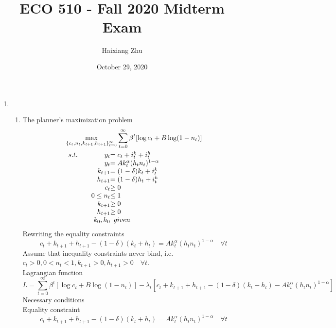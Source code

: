 \documentclass{article}
\title{ECO 510 - Fall 2020 Midterm Exam}
\date{October 29, 2020}
\author{Haixiang Zhu}
\begin{document}
    \maketitle
    \renewcommand{\arraystretch}{1.5}
    \begin{enumerate}
        \item 
        \begin{enumerate}
            \item The  planner's maximization problem
            \begin{align*}
                &\max_{\{c_t,n_t,k_{t+1},h_{t+1}\}_{t=0}^\infty}\sum_{t=0}^\infty\beta^t[\log c_t+B\log(1-n_t)]\\
                &\begin{array}{r@{\qquad}r@{}l}
                s.t.&y_t&=c_t+i_t^k+i_t^h\\
                &y_t&=Ak_t^\alpha(h_tn_t)^{1-\alpha}\\
                &k_{t+1}&=(1-\delta)k_t+i_t^k\\
                &h_{t+1}&=(1-\delta)h_t+i_t^h\\
                &c_t&\ge0\\
                &0\le n_t&\le 1\\
                &k_{t+1}&\ge0\\
                &h_{t+1}&\ge0\\
                &k_0,h_0&\enspace given
                \end{array} 
            \end{align*}
            Rewriting the equality constraints
            \begin{equation*}
                c_t+k_{t+1}+h_{t+1}-(1-\delta)(k_t+h_t)=Ak_t^\alpha(h_tn_t)^{1-\alpha}\quad\forall t
            \end{equation*}
            Assume that inequality constraints never bind, i.e.$c_t>0,0<n_t<1,k_{t+1}>0,h_{t+1}>0\quad\forall t$.\\
            Lagrangian function
            \begin{equation*}
                L=\sum_{t=0}^\infty\beta^t[\log c_t+B\log(1-n_t)]-\lambda_t[c_t+k_{t+1}+h_{t+1}-(1-\delta)(k_t+h_t)-Ak_t^\alpha(h_tn_t)^{1-\alpha}]
            \end{equation*}
            Necessary conditions\\
            Equality constraint
            \begin{equation*}
                c_t+k_{t+1}+h_{t+1}-(1-\delta)(k_t+h_t)=Ak_t^\alpha(h_tn_t)^{1-\alpha}\quad\forall t

\end{equation*}
\end{enumerate}
\end{enumerate}
\end{document}
